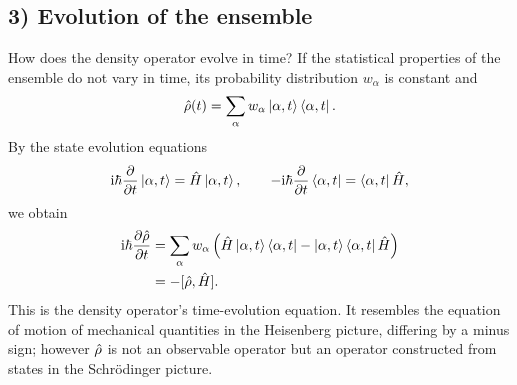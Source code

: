 \subsection*{3) Evolution of the ensemble}
How does the density operator evolve in time? If the statistical properties of the ensemble do not vary in time, its probability distribution $w_\alpha$ is constant and
\begin{equation}
\hat{\rho}(t)=\sum_\alpha w_\alpha\left|\alpha,t\right\rangle\left\langle\alpha,t\right|.
\end{equation}
By the state evolution equations
\begin{equation}
\mathrm{i}\hbar\frac\partial{\partial t}\left|\alpha,t\right\rangle=\hat{H}\left|\alpha,t\right\rangle,\qquad
-\mathrm{i}\hbar\frac\partial{\partial t}\left\langle\alpha,t\right|=\left\langle\alpha,t\right|\hat{H},
\end{equation}
we obtain
\begin{equation}\begin{aligned}
\mathrm{i}\hbar\frac{\partial\hat{\rho}}{\partial t}
&=\sum_\alpha w_\alpha\left(\hat{H}\left|\alpha,t\right\rangle\left\langle\alpha,t\right|
-\left|\alpha,t\right\rangle\left\langle\alpha,t\right|\hat{H}\right)\\
&=-[\hat{\rho},\hat{H}].
\end{aligned}\end{equation}
This is the density operator's time-evolution equation. It resembles the equation of motion of mechanical quantities in the Heisenberg picture, differing by a minus sign; however $\hat{\rho}$ is not an observable operator but an operator constructed from states in the Schrödinger picture.